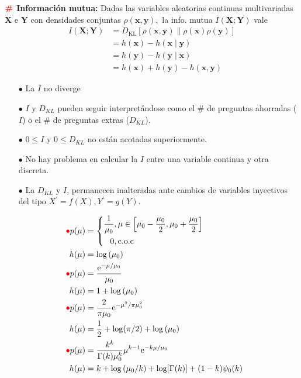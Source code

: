 \documentclass[%
 reprint,
 amsmath,amssymb,
 aps,
]{revtex4-1}
\begin{document}
\textbf{$\color{red}{\textbf{\#}}$ Información mutua:} 
Dadas las variables aleatorias continuas multivariadas $\boldsymbol{X}$ e $\boldsymbol{Y}$ con densidades conjuntas $\rho(\boldsymbol{x}, \boldsymbol{y}),$
la info. mutua $I(\boldsymbol{X} ; \boldsymbol{Y})$ vale
$$
\begin{aligned}
I(\boldsymbol{X} ; \boldsymbol{Y}) &=D_{\mathrm{KL}}[\rho(\boldsymbol{x}, \boldsymbol{y}) \| \rho(\boldsymbol{x}) \rho(\boldsymbol{y})] \\
&=h(\boldsymbol{x})-h(\boldsymbol{x} \mid \boldsymbol{y}) \\
&=h(\boldsymbol{y})-h(\boldsymbol{y} \mid \boldsymbol{x}) \\
&=h(\boldsymbol{x})+h(\boldsymbol{y})-h(\boldsymbol{x}, \boldsymbol{y})
\end{aligned}
$$
\begin{itemize}
  \item[$\bullet$] La $I$ no diverge
  \item[$\bullet$] $I$ y $D_{KL}$ pueden seguir interpretándose como el \# de preguntas ahorradas ($I$) o el \# de preguntas
  extras ($D_{KL}$).
  \item[$\bullet$] $0 \leq I$ y $0 \leq D_{KL}$ no están acotadas superiormente.
  \item[$\bullet$] No hay problema en calcular la $I$ entre una variable continua y otra discreta. 
  \item[$\bullet$] La $D_{KL}$ y $I$, permanecen inalteradas ante cambios de variables inyectivos del tipo $X^{\prime}=f(X), Y^{\prime}=g(Y).$
\end{itemize}
$$
\begin{aligned}
  {\color{red}{\bullet}} p(\mu)&=
  \left\{
    \begin{aligned}
      \frac{1}{\mu_{0}} & , \mu \in\left[\mu_{0}-\frac{\mu_0}{2}, \mu_{0}+\frac{\mu_0}{2}\right] \\
      0 & ,\text{c.o.c}
    \end{aligned}
  \right. \\
  h(\mu) &=\log \left(\mu_{0}\right)\\
  {\color{red}{\bullet}} p(\mu) &=\frac{\mathrm{e}^{-\mu / \mu_{0}}}{\mu_{0}} \\
  {\quad} h(\mu) &=1+\log \left(\mu_{0}\right)\\
  {\color{red}{\bullet}} p(\mu) &=\frac{2}{\pi \mu_{0}} \mathrm{e}^{-\mu^{2} / \pi \mu_{0}^{2}} \\
  {\quad} h(\mu) &=\frac{1}{2}+\log (\pi / 2)+\log \left(\mu_{0}\right) \\
  {\color{red}{\bullet}} p(\mu) &=\frac{k^{k}}{\Gamma(k) \mu_{0}^{k}} \mu^{k-1} \mathrm{e}^{-k \mu / \mu_{0}} \\ 
  h(\mu)&=k+\log \left(\mu_{0} / k\right)+\log [\Gamma(k)]+(1-k) \psi_{0}(k)
\end{aligned}
$$
\end{document}
